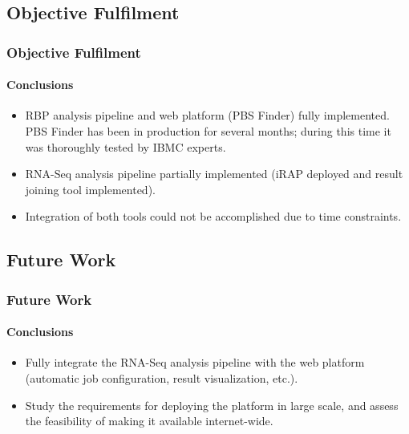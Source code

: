 \documentclass{beamer}
\begin{document}
\subsection{Objective Fulfilment}
\begin{frame}
  \frametitle{Objective Fulfilment}
  \framesubtitle{Conclusions}

\begin{itemize}
\item
RBP analysis pipeline and web platform (PBS Finder) fully implemented. PBS
Finder has been in production for several months; during this time it was
thoroughly tested by IBMC experts.\\ \vspace{0.8cm}

\item
RNA-Seq analysis pipeline partially implemented (iRAP deployed and result
joining tool implemented).\\ \vspace{0.8cm}

\item
Integration of both tools could not be accomplished due to time constraints.
\end{itemize}


\end{frame}

\subsection{Future Work}
\begin{frame}
  \frametitle{Future Work}
  \framesubtitle{Conclusions}

\begin{itemize}
\item
Fully integrate the RNA-Seq analysis pipeline with the web platform (automatic
job configuration, result visualization, etc.).\\ \vspace{1.2cm}

\item
Study the requirements for deploying the platform in large scale, and assess the
feasibility of making it available internet-wide.
\end{itemize}


\end{frame}
\end{document}
